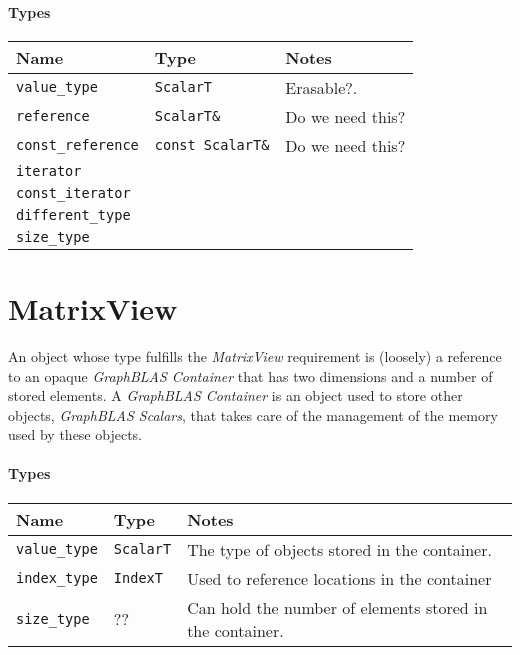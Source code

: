 \paragraph{Types}

\begin{tabularx}{\textwidth}{l l X}
\textbf{Name} & \textbf{Type} & \textbf{Notes}\\
\hline
\texttt{value\_type} & \texttt{ScalarT}  & Erasable?.\\ \hline
\texttt{reference}  & \texttt{ScalarT\&} & Do we need this? \\ \hline
\texttt{const\_reference}  & \texttt{const ScalarT\&} & Do we need this? \\ \hline
\texttt{iterator}  & & \\ \hline
\texttt{const\_iterator}  & & \\ \hline
\texttt{different\_type}  & & \\ \hline
\texttt{size\_type}  & &
\end{tabularx}

\section{MatrixView}
An object whose type fulfills the \textit{MatrixView} requirement is (loosely) a 
reference to an opaque \textit{GraphBLAS Container} that has two dimensions and a 
number of stored elements.  A \textit{GraphBLAS Container} is an object used to store
other objects, \textit{GraphBLAS Scalars}, that takes care of the management of the
memory used by these objects. 



\paragraph{Types}

\begin{tabularx}{\textwidth}{l l X}
\textbf{Name} & \textbf{Type} & \textbf{Notes}\\
\hline
\texttt{value\_type} & \texttt{ScalarT}  & The type of objects stored in the container.\\ \hline
\texttt{index\_type} & \texttt{IndexT}   & Used to reference locations in the container \\ \hline
\texttt{size\_type}  & ??                & Can hold the number of elements stored in the container.
\end{tabularx}

